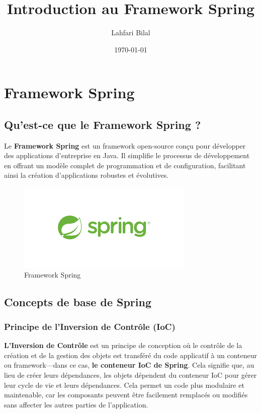\documentclass{article}
\title{Introduction au Framework Spring}
\author{Lahfari Bilal}
\date{\today}
\begin{document}
\maketitle

\section{Framework Spring}
\subsection{Qu'est-ce que le Framework Spring ?}

Le \textbf{Framework Spring} est un framework open-source conçu pour développer des applications d'entreprise en Java. Il simplifie le processus de développement en offrant un modèle complet de programmation et de configuration, facilitant ainsi la création d'applications robustes et évolutives.

\begin{figure}[H]
    \centering
    \begin{framed}
        \includegraphics[width=0.8\linewidth]{images/spring_logo.png}
    \end{framed}
    \caption{Framework Spring}
    \label{fig:spring-logo}
\end{figure}

\subsection{Concepts de base de Spring}

\subsubsection{Principe de l'Inversion de Contrôle (IoC)}

\textbf{L'Inversion de Contrôle} est un principe de conception où le contrôle de la création et de la gestion des objets est transféré du code applicatif à un conteneur ou framework—dans ce cas, \textbf{le conteneur IoC de Spring}. Cela signifie que, au lieu de créer leurs dépendances, les objets dépendent du conteneur IoC pour gérer leur cycle de vie et leurs dépendances. Cela permet un code plus modulaire et maintenable, car les composants peuvent être facilement remplacés ou modifiés sans affecter les autres parties de l'application.
\end{document}
